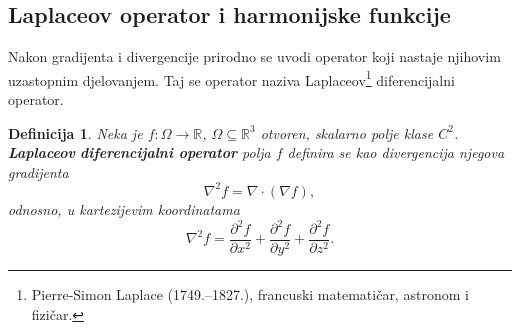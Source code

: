 \documentclass[12pt,a4paper]{article}
\newtheorem{deff}[tm]{Definicija}
\begin{document}
\subsection{Laplaceov operator i harmonijske funkcije}

Nakon gradijenta i divergencije prirodno se uvodi operator koji nastaje
njihovim uzastopnim djelovanjem. Taj se operator naziva Laplaceov\footnote{Pierre-Simon Laplace (1749.--1827.), francuski matematičar, astronom i fizičar.} diferencijalni operator.

\begin{deff}
Neka je $f:\Omega\to\mathbb{R}$, $\Omega \subseteq \mathbb{R}^3$ otvoren, skalarno polje klase $C^2$.
\textit{\textbf{Laplaceov} \textbf{diferencijalni operator}} polja $f$
definira se kao divergencija njegova gradijenta
$$
\nabla^2 f
=
\nabla\cdot(\nabla f),
$$
odnosno, u kartezijevim koordinatama
$$
\nabla^2 f
=
\frac{\partial^2 f}{\partial x^2}
+
\frac{\partial^2 f}{\partial y^2}
+
\frac{\partial^2 f}{\partial z^2}.
$$
\end{deff}
\end{document}
